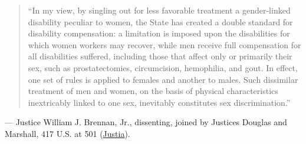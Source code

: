 \documentclass[12pt]{article}
\begin{document}
\begin{quote}
``In my view, by singling out for less favorable treatment a gender-linked disability peculiar to women, the State has created a double standard for disability compensation: a limitation is imposed upon the disabilities for which women workers may recover, while men receive full compensation for all disabilities suffered, including those that affect only or primarily their sex, such as prostatectomies, circumcision, hemophilia, and gout. In effect, one set of rules is applied to females and another to males. Such dissimilar treatment of men and women, on the basis of physical characteristics inextricably linked to one sex, inevitably constitutes sex discrimination.''
\end{quote}
\noindent --- Justice William J. Brennan, Jr., dissenting, joined by Justices Douglas and Marshall, 417 U.S. at 501 (\href{https://supreme.justia.com/cases/federal/us/417/484/}{Justia}).
\end{document}
